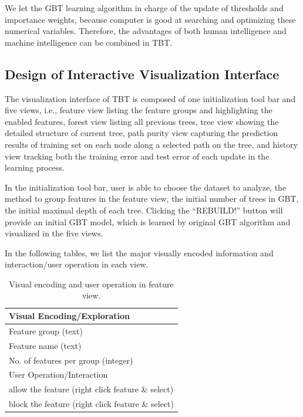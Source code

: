\documentclass{chi2009}
\begin{document}
We let the GBT learning algorithm in charge of the update of thresholds and importance weights, because computer is good at searching and optimizing these numerical variables. Therefore, the advantages of both human intelligence and machine intelligence can be combined in TBT.

\subsection{Design of Interactive Visualization Interface}

The visualization interface of TBT is composed of one initialization tool bar and five views, i.e., feature view listing the feature groups and highlighting the enabled features, forest view listing all previous trees, tree view showing the detailed structure of current tree, path purity view capturing the prediction results of training set on each node along a selected path on the tree, and history view tracking both the training error and test error of each update in the learning process. 

In the initialization tool bar, user is able to choose the dataset to analyze, the method to group features in the feature view, the initial number of trees in GBT, the initial maximal depth of each tree. Clicking the ``REBUILD!'' button will provide an initial GBT model, which is learned by original GBT algorithm and visualized in the five views.

In the following tables, we list the major visually encoded information and interaction/user operation in each view.

\begin{table}[ht]
\caption{Visual encoding and user operation in feature view.}
\begin{center}
\begin{tabular}{|l|}
\hline
Visual Encoding/Exploration\\
\hline
Feature group (text)\\
Feature name (text)\\
No. of features per group (integer) \\
\hline
\hline 
User Operation/Interaction\\
\hline
allow the feature (right click feature \& select)\\
block the feature (right click feature \& select)\\
\hline
\end{tabular}
\end{center}
\end{table}
\end{document}
